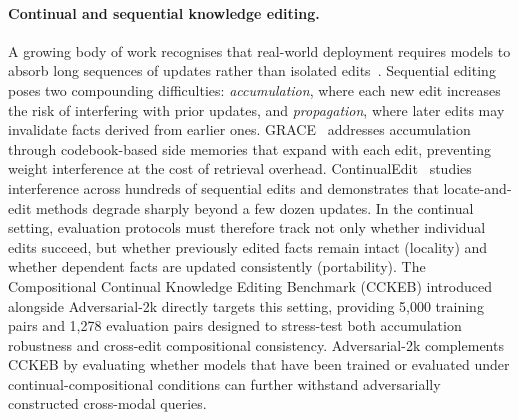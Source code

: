 \documentclass{article}
\begin{document}
\paragraph{Continual and sequential knowledge editing.}
A growing body of work recognises that real-world deployment requires models to absorb long sequences of updates rather than isolated edits~\cite{KE_24survey}. Sequential editing poses two compounding difficulties: \emph{accumulation}, where each new edit increases the risk of interfering with prior updates, and \emph{propagation}, where later edits may invalidate facts derived from earlier ones. GRACE~\cite{wise24} addresses accumulation through codebook-based side memories that expand with each edit, preventing weight interference at the cost of retrieval overhead. ContinualEdit~\cite{easyedit24} studies interference across hundreds of sequential edits and demonstrates that locate-and-edit methods degrade sharply beyond a few dozen updates. In the continual setting, evaluation protocols must therefore track not only whether individual edits succeed, but whether previously edited facts remain intact (locality) and whether dependent facts are updated consistently (portability). The Compositional Continual Knowledge Editing Benchmark (CCKEB) introduced alongside Adversarial-2k directly targets this setting, providing 5{,}000 training pairs and 1{,}278 evaluation pairs designed to stress-test both accumulation robustness and cross-edit compositional consistency. Adversarial-2k complements CCKEB by evaluating whether models that have been trained or evaluated under continual-compositional conditions can further withstand adversarially constructed cross-modal queries.
\end{document}

